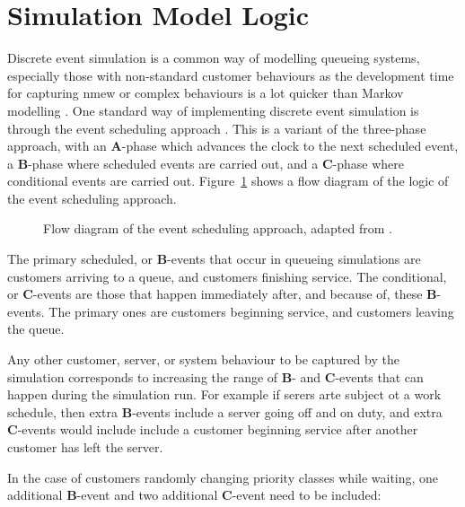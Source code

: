 \documentclass{article}
\begin{document}
\section{Simulation Model Logic}\label{sec:simulation}
Discrete event simulation is a common way of modelling queueing systems,
especially those with non-standard customer behaviours as the development time
for capturing nmew or complex behaviours is a lot quicker than Markov modelling
\cite{standfield14}.
One standard way of implementing discrete event simulation is through the event
scheduling approach \cite{robinson14}. This is a variant of the three-phase
approach, with an \textbf{A}-phase which advances the clock to the next
scheduled event, a \textbf{B}-phase where scheduled events are carried out, and
a \textbf{C}-phase where conditional events are carried out.
Figure~\ref{fig:eventscheduling} shows a flow diagram of the logic of the event
scheduling approach.

\begin{figure}
    \centering
    
    \caption{Flow diagram of the event scheduling approach, adapted from
    \cite{palmer18}.}
    \label{fig:eventscheduling}
\end{figure}

The primary scheduled, or \textbf{B}-events that occur in queueing simulations
are customers arriving to a queue, and customers finishing service.
The conditional, or \textbf{C}-events are those that happen immediately after,
and because of, these \textbf{B}-events. The primary ones are customers
beginning service, and customers leaving the queue.

Any other customer, server, or system behaviour to be captured by the simulation
corresponds to increasing the range of \textbf{B}- and \textbf{C}-events that
can happen during the simulation run. For example if serers arte subject ot a
work schedule, then extra \textbf{B}-events include a server going off and on
duty, and extra \textbf{C}-events would include include a customer beginning
service after another customer has left the server.

In the case of customers randomly changing priority classes while waiting, one
additional \textbf{B}-event and two additional \textbf{C}-event need to be
included:
\end{document}
